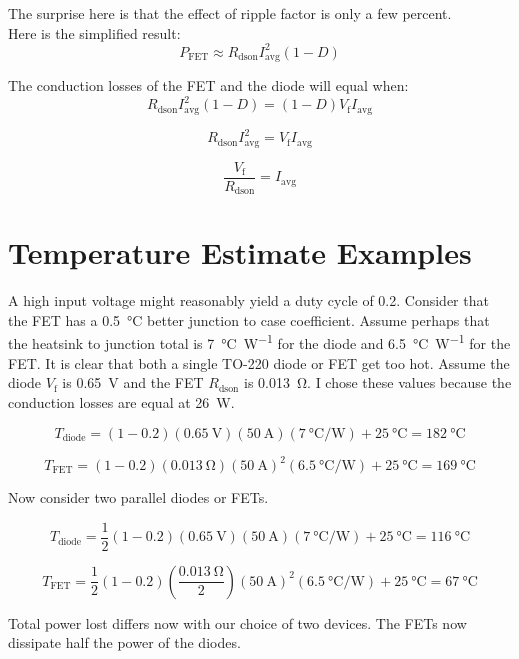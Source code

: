 \documentclass{article}
\begin{document}
The surprise here is that the effect of ripple factor is only a few percent.\\

Here is the simplified result:
\begin{equation}
P_\text{FET} \approx R_\text{dson} I_\text{avg}^2 (1-D)
\end{equation}

The conduction losses of the FET and the diode will equal when:
\[
R_\text{dson} I_\text{avg}^2 (1-D) = (1-D) V_\text{f} I_\text{avg}
\]

\[
R_\text{dson} I_\text{avg}^2 = V_\text{f} I_\text{avg}
\]

\begin{equation}
\frac{V_\text{f}}{R_\text{dson}} = I_\text{avg}
\end{equation}

\section{Temperature Estimate Examples}
A high input voltage might reasonably yield a duty cycle of \num{0.2}.
Consider that the FET has a \qty{0.5}{\celsius} better junction to case coefficient.
Assume perhaps that the heatsink to junction total is \qty{7}{\celsius\per\watt} for the diode and \qty{6.5}{\celsius\per\watt} for the FET.
It is clear that both a single TO-220 diode or FET get too hot.
Assume the diode $V_\text{f}$ is \qty{0.65}{\volt} and the FET $R_\text{dson}$ is \qty{0.013}{\ohm}.  I chose these values because the conduction losses are equal at \qty{26}{\watt}.

\[
T_\text{diode} = (\num{1}-\num{0.2}) (\qty{0.65}{\volt}) (\qty{50}{\ampere}) (\qty{7}{\celsius\per\watt}) + \qty{25}{\celsius} = \qty{182}{\celsius}
\]

\[
T_\text{FET} = (1-0.2) (\qty{0.013}{\ohm}) (\qty{50}{\ampere})^2 (\qty{6.5}{\celsius\per\watt}) + \qty{25}{\celsius} = \qty{169}{\celsius}
\]

Now consider two parallel diodes or FETs.

\[
T_\text{diode} = \frac{1}{2}(\num{1}-\num{0.2}) (\qty{0.65}{\volt}) (\qty{50}{\ampere}) (\qty{7}{\celsius\per\watt}) + \qty{25}{\celsius} = \qty{116}{\celsius}
\]

\[
T_\text{FET} = \frac{1}{2}(\num{1}-\num{0.2}) (\frac{\qty{0.013}{\ohm}}{2}) (\qty{50}{\ampere})^2 (\qty{6.5}{\celsius\per\watt}) + \qty{25}{\celsius} = \qty{67}{\celsius}
\]

Total power lost differs now with our choice of two devices.  The FETs now dissipate half the power of the diodes.
\end{document}
